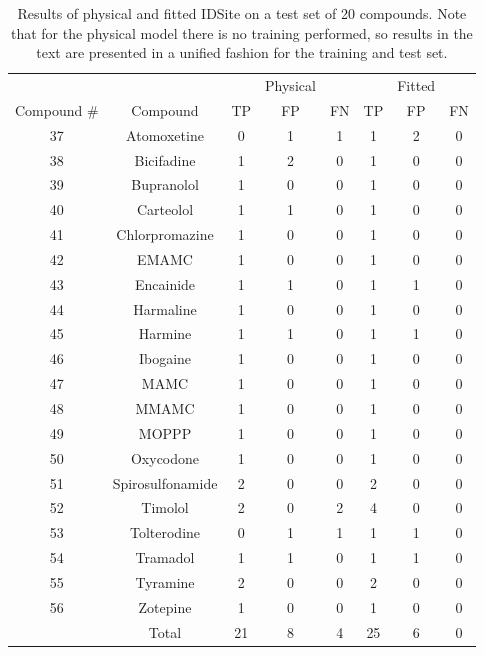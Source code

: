 \begin{table}[h]
\singlespace
\footnotesize
\centering
\begin{tabular}{cccccccc}
\hline
 &  &  & Physical &  &  & Fitted & \\
Compound \# & Compound & TP & FP & FN & TP & FP & FN \\
\hline
37 & Atomoxetine & 0 & 1 & 1 & 1 & 2 & 0 \\
38 & Bicifadine & 1 & 2 & 0 & 1 & 0 & 0 \\
39 & Bupranolol & 1 & 0 & 0 & 1 & 0 & 0 \\
40 & Carteolol & 1 & 1 & 0 & 1 & 0 & 0 \\
41 & Chlorpromazine & 1 & 0 & 0 & 1 & 0 & 0 \\
42 & EMAMC & 1 & 0 & 0 & 1 & 0 & 0 \\
43 & Encainide & 1 & 1 & 0 & 1 & 1 & 0 \\
44 & Harmaline & 1 & 0 & 0 & 1 & 0 & 0 \\
45 & Harmine & 1 & 1 & 0 & 1 & 1 & 0 \\
46 & Ibogaine & 1 & 0 & 0 & 1 & 0 & 0 \\
47 & MAMC & 1 & 0 & 0 & 1 & 0 & 0 \\
48 & MMAMC & 1 & 0 & 0 & 1 & 0 & 0 \\
49 & MOPPP & 1 & 0 & 0 & 1 & 0 & 0 \\
50 & Oxycodone & 1 & 0 & 0 & 1 & 0 & 0 \\
51 & Spirosulfonamide & 2 & 0 & 0 & 2 & 0 & 0 \\
52 & Timolol & 2 & 0 & 2 & 4 & 0 & 0 \\
53 & Tolterodine & 0 & 1 & 1 & 1 & 1 & 0 \\
54 & Tramadol & 1 & 1 & 0 & 1 & 1 & 0 \\
55 & Tyramine & 2 & 0 & 0 & 2 & 0 & 0 \\
56 & Zotepine & 1 & 0 & 0 & 1 & 0 & 0 \\
 & Total & 21 & 8 & 4 & 25 & 6 & 0 \\
\hline
\end{tabular}
\caption{Results of physical and fitted IDSite on a test set of 20 compounds.
Note that for the physical model there is no training performed, so results in the text are presented in a unified fashion for the training and test set.}
\label{table:p450_testing}
\end{table}





